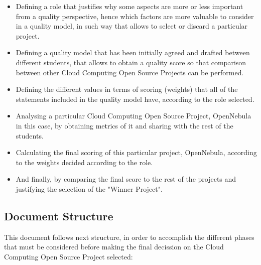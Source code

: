 \documentclass[11pt]{article}
\begin{document}
\begin{itemize}\itemsep0pt
\item{Defining a role that justifies why some aspects are more or less important from a quality perspective, hence which factors are more valuable to consider in a quality model, in such way that allows to select or discard a particular project.}
\item{Defining a quality model that has been initially agreed and drafted between different students, that allows to obtain a quality score so that comparison between other Cloud Computing Open Source Projects can be performed.}
\item{Defining the different values in terms of scoring (weights) that all of the statements included in the quality model have, according to the role selected.}
\item{Analysing a particular Cloud Computing Open Source Project, OpenNebula in this case, by obtaining metrics of it and sharing with the rest of the students.}
\item{Calculating the final scoring of this particular project, OpenNebula, according to the weights decided according to the role.}
\item{And finally, by comparing the final score to the rest of the projects and justifying the selection of the "Winner Project".}
\end{itemize}

\subsection{Document Structure}
This document follows next structure, in order to accomplish the different phases that must be considered before making the final decission on the Cloud Computing Open Source Project selected:
\end{document}
